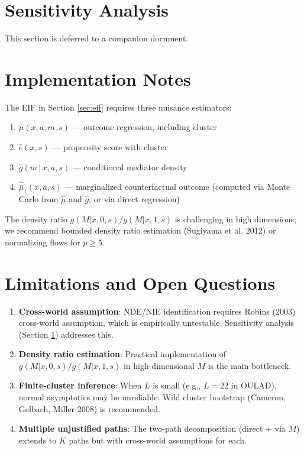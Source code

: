 \documentclass[11pt]{article}
\theoremstyle{plain}
\theoremstyle{definition}
\theoremstyle{remark}
\newcommand{\given}{\,|\,}
\begin{document}
\section{Sensitivity Analysis}
\label{sec:sensitivity}

This section is deferred to a companion document.

\section{Implementation Notes}
\label{sec:implementation}

The EIF in Section \ref{sec:eif} requires three nuisance estimators:
\begin{enumerate}[itemsep=2pt]
    \item $\hat\mu(x, a, m, s)$ — outcome regression, including cluster
    \item $\hat e(x, s)$ — propensity score with cluster
    \item $\hat g(m \given x, a, s)$ — conditional mediator density
    \item $\hat{\bar\mu}_1(x, a, s)$ — marginalized counterfactual outcome (computed via Monte Carlo from $\hat\mu$ and $\hat g$, or via direct regression)
\end{enumerate}

The density ratio $g(M|x,0,s)/g(M|x,1,s)$ is challenging in high dimensions; we recommend bounded density ratio estimation (Sugiyama et al. 2012) or normalizing flows for $p \geq 5$.

\section{Limitations and Open Questions}
\label{sec:limitations}

\begin{enumerate}[itemsep=4pt]
    \item \textbf{Cross-world assumption}: NDE/NIE identification requires Robins (2003) cross-world assumption, which is empirically untestable. Sensitivity analysis (Section \ref{sec:sensitivity}) addresses this.
    
    \item \textbf{Density ratio estimation}: Practical implementation of $g(M|x,0,s)/g(M|x,1,s)$ in high-dimensional $M$ is the main bottleneck.
    
    \item \textbf{Finite-cluster inference}: When $L$ is small (e.g., $L=22$ in OULAD), normal asymptotics may be unreliable. Wild cluster bootstrap (Cameron, Gelbach, Miller 2008) is recommended.
    
    \item \textbf{Multiple unjustified paths}: The two-path decomposition (direct + via $M$) extends to $K$ paths but with cross-world assumptions for each.
\end{enumerate}
\end{document}
